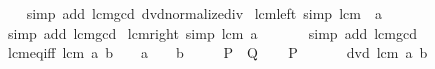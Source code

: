 \begin{isabellebody}
\ \ %
\endisadelimproof
%
\isatagproof
{}\isamarkupfalse%
\ {\isacharparenleft}{\kern0pt}simp\ add{\isacharcolon}{\kern0pt}\ lcm{\isacharunderscore}{\kern0pt}gcd\ dvd{\isacharunderscore}{\kern0pt}normalize{\isacharunderscore}{\kern0pt}div{\isacharparenright}{\kern0pt}%
\endisatagproof
{\isafoldproof}%
%
\isadelimproof
\isanewline
%
\endisadelimproof
\isanewline
{}\isamarkupfalse%
\ lcm{\isacharunderscore}{\kern0pt}{}{\isacharunderscore}{\kern0pt}left\ {\isacharbrackleft}{\kern0pt}simp{\isacharbrackright}{\kern0pt}{\isacharcolon}{\kern0pt}\ {\isachardoublequoteopen}lcm\ {}\ a\ {\isacharequal}{\kern0pt}\ {}{\isachardoublequoteclose}\isanewline
%
\isadelimproof
\ \ %
\endisadelimproof
%
\isatagproof
{}\isamarkupfalse%
\ {\isacharparenleft}{\kern0pt}simp\ add{\isacharcolon}{\kern0pt}\ lcm{\isacharunderscore}{\kern0pt}gcd{\isacharparenright}{\kern0pt}%
\endisatagproof
{\isafoldproof}%
%
\isadelimproof
\isanewline
%
\endisadelimproof
\isanewline
{}\isamarkupfalse%
\ lcm{\isacharunderscore}{\kern0pt}{}{\isacharunderscore}{\kern0pt}right\ {\isacharbrackleft}{\kern0pt}simp{\isacharbrackright}{\kern0pt}{\isacharcolon}{\kern0pt}\ {\isachardoublequoteopen}lcm\ a\ {}\ {\isacharequal}{\kern0pt}\ {}{\isachardoublequoteclose}\isanewline
%
\isadelimproof
\ \ %
\endisadelimproof
%
\isatagproof
{}\isamarkupfalse%
\ {\isacharparenleft}{\kern0pt}simp\ add{\isacharcolon}{\kern0pt}\ lcm{\isacharunderscore}{\kern0pt}gcd{\isacharparenright}{\kern0pt}%
\endisatagproof
{\isafoldproof}%
%
\isadelimproof
\isanewline
%
\endisadelimproof
\isanewline
{}\isamarkupfalse%
\ lcm{\isacharunderscore}{\kern0pt}eq{\isacharunderscore}{\kern0pt}{}{\isacharunderscore}{\kern0pt}iff{\isacharcolon}{\kern0pt}\ {\isachardoublequoteopen}lcm\ a\ b\ {\isacharequal}{\kern0pt}\ {}\ {\isasymlongleftrightarrow}\ a\ {\isacharequal}{\kern0pt}\ {}\ {\isasymor}\ b\ {\isacharequal}{\kern0pt}\ {}{\isachardoublequoteclose}\isanewline
\ \ {\isacharparenleft}{\kern0pt}\ {\isachardoublequoteopen}{\isacharquery}{\kern0pt}P\ {\isasymlongleftrightarrow}\ {\isacharquery}{\kern0pt}Q{\isachardoublequoteclose}{\isacharparenright}{\kern0pt}\isanewline
%
\isadelimproof
%
\endisadelimproof
%
\isatagproof
{}\isamarkupfalse%
\isanewline
\ \ \isamarkupfalse%
\ {\isacharquery}{\kern0pt}P\isanewline
\ \ \isamarkupfalse%
\ \isamarkupfalse%
\ {\isachardoublequoteopen}{}\ dvd\ lcm\ a\ b{\isachardoublequoteclose}\isanewline

\end{isabellebody}
